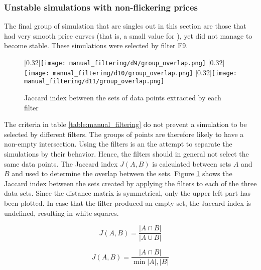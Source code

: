 \subsubsection*{Unstable simulations with non-flickering prices}
The final group of simulation that are singles out in this section are those that had very smooth price curves (that is, a small value for \stdev), yet did not manage to become stable. These simulations were selected by filter F9.

\begin{figure}
\centering
{}[0.32\linewidth]{\texttt{[image: manual\_filtering/d9/group\_overlap.png]}\label{figure:jaccard_index_a}}
[0.32\linewidth]{\texttt{[image: manual\_filtering/d10/group\_overlap.png]}\label{figure:jaccard_index_b}}
[0.32\linewidth]{\texttt{[image: manual\_filtering/d11/group\_overlap.png]}\label{figure:jaccard_index_c}}
\caption{Jaccard index between the sets of data points extracted by each filter}
\label{figure:jaccard_index}
\end{figure}

The criteria in table \ref{table:manual_filtering} do not prevent a simulation to be selected by different filters. The groups of points are therefore likely to have a non-empty intersection. Using the filters is an the attempt to separate the simulations by their behavior. Hence, the filters should in general not select the same data points. The Jaccard index $J(A,B)$ is calculated between sets $A$ and $B$ and used to determine the overlap between the sets. Figure \ref{figure:jaccard_index} shows the Jaccard index between the sets created by applying the filters to each of the three data sets. Since the distance matrix is symmetrical, only the upper left part has been plotted. In case that the filter produced an empty set, the Jaccard index is undefined, resulting in white squares.

\begin{equation}
J(A,B) = \frac{\lvert A \cap B \rvert}{\lvert A \cup B\rvert }
\end{equation}

\begin{equation}
J(A,B) = \frac{\lvert A \cap B \rvert}{\min \lvert A \rvert, \lvert B\rvert }
\end{equation}


